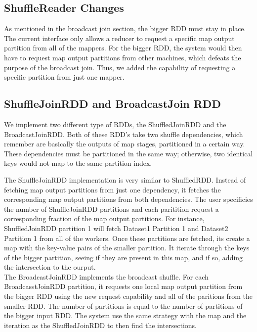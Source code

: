 \subsection{ShuffleReader Changes}

As mentioned in the broadcast join section, the bigger RDD must stay in place. The current interface only allows a reducer to request a specific map output partition
 from all of the mappers. For the bigger RDD, the system would then have to request map output partitions from other machines, which defeats the purpose of the broadcast join. Thus, we added the capability of requesting a specific partition from just one mapper. 

\subsection{ShuffleJoinRDD and BroadcastJoin RDD}

We implement two different type of RDDs, the ShuffledJoinRDD and the
BroadcastJoinRDD. Both of these RDD's take two shuffle dependencies, which remember
are basically the outputs of map stages, partitioned in a certain way. These 
dependencies must be partitioned in the same way; otherwise, two identical keys would not map to the same partition index.  


The ShuffleJoinRDD implementation is very similar to ShuffledRDD. Instead of fetching map output partitions
from just one dependency, it fetches the corresponding map output partitions from both dependencies.   
The user specificies the number of ShuffleJoinRDD partitions and each paritition request a corresponding fraction
of the map output partitions.
For instance, ShuffledJoinRDD partition 1 will fetch Dataset1 Partition 1 and Dataset2
Partition 1 from all of the workers. Once these partitions are fetched, its create a map with the key-value pairs of the smaller partition.
It iterate through the keys of the bigger partition, seeing if they are present in this map, and if so,  adding the intersection to the ourput.\\

The BroadcastJoinRDD implements the broadcast shuffle.
For each BroadcasstJoinRDD partition, it requests one local map output partition from the bigger RDD using the new request capability and  
all of the paritions from the smaller RDD. The number of partitions is equal to the number of partitions of the bigger input RDD. The system use the same strategy
with the map and the iteration as the ShuffledJoinRDD to then find the intersections.

